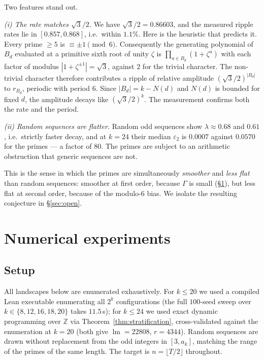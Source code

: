 \documentclass[11pt,a4paper]{article}
\theoremstyle{plain}
\theoremstyle{definition}
\theoremstyle{remark}
\DeclareMathOperator{\lm}{lm}
\begin{document}
Two features stand out.

\emph{(i) The rate matches $\sqrt3/2$.} We have $\sqrt3/2=0.86603$, and the
measured ripple rates lie in $[0.857,0.868]$, i.e.\ within $1.1\%$. Here is the
heuristic that predicts it. Every prime $\ge5$ is $\equiv\pm1\pmod6$.
Consequently the generating polynomial of $B_d$ evaluated at a primitive sixth
root of unity $\zeta$ is $\prod_{a\in B_d}(1+\zeta^{a})$ with each factor of
modulus $|1+\zeta^{\pm1}|=\sqrt3$, against $2$ for the trivial character. The
non-trivial character therefore contributes a ripple of relative amplitude
$(\sqrt3/2)^{|B_d|}$ to $r_{B_d}$, periodic with period $6$. Since
$|B_d|=k-N(d)$ and $N(d)$ is bounded for fixed $d$, the amplitude decays like
$(\sqrt3/2)^{k}$. The measurement confirms both the rate and the period.

\emph{(ii) Random sequences are flatter.} Random odd sequences show
$\lambda\approx0.68$ and $0.61$, i.e.\ strictly faster decay, and at $k=24$
their median $\varepsilon_2$ is $0.0007$ against $0.0570$ for the primes --- a
factor of $80$. The primes are subject to an arithmetic obstruction that generic
sequences are not.

This is the sense in which the primes are simultaneously \emph{smoother} and
\emph{less flat} than random sequences: smoother at first order, because
$\Gamma$ is small (\S\ref{sec:experiments}), but less flat at second order,
because of the modulo-$6$ bias. We isolate the resulting conjecture in
\S\ref{sec:open}.

\section{Numerical experiments}\label{sec:experiments}

\subsection{Setup}

All landscapes below are enumerated exhaustively. For $k\le20$ we used a
compiled Lean executable enumerating all $2^{k}$ configurations (the full
$100$-seed sweep over $k\in\{8,12,16,18,20\}$ takes $11.5$\,s); for $k\le24$ we
used exact dynamic programming over $\mathbb{Z}$ via
Theorem~\ref{thm:stratification}, cross-validated against the enumeration at
$k=20$ (both give $\lm=22808$, $r=4344$). Random sequences are drawn without
replacement from the odd integers in $[3,a_k]$, matching the range of the primes
of the same length. The target is $n=\lfloor T/2\rfloor$ throughout.
\end{document}
